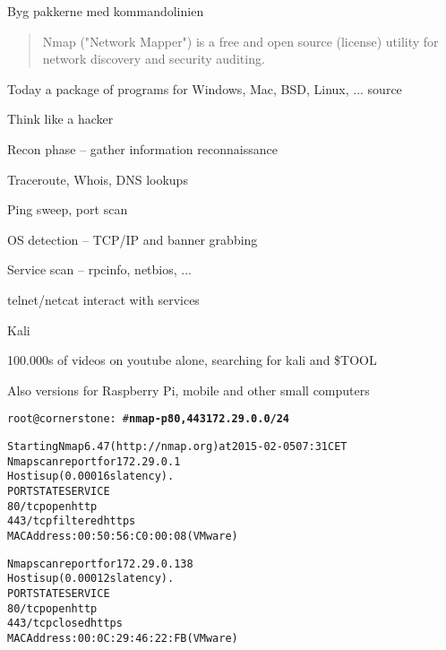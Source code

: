 \documentclass[20pt,landscape,a4paper,footrule]{foils}
\begin{document}
\vskip 1cm
\centerline{Byg pakkerne med kommandolinien}



\begin{quote}
Nmap ("Network Mapper") is a free and open source (license) utility for network discovery and security auditing.
\end{quote}

\centerline{Today a package of programs for Windows, Mac, BSD, Linux, ... source}







\begin{list1}
\item Think like a hacker
\item Recon phase -- gather information reconnaissance
\begin{list2}
\item Traceroute, Whois, DNS lookups
\item Ping sweep, port scan
\item OS detection -- TCP/IP and banner grabbing
\item Service scan -- rpcinfo, netbios, ...
\item telnet/netcat interact with services
\end{list2}
\end{list1}



\begin{list1}
\item  Kali 
\item 100.000s of videos on youtube alone, searching for kali and \$TOOL
\item Also versions for Raspberry Pi, mobile and other small computers
\end{list1}



\begin{alltt}\small
root@cornerstone:~#{\bfseries  nmap -p80,443 172.29.0.0/24}

Starting Nmap 6.47 ( http://nmap.org ) at 2015-02-05 07:31 CET
Nmap scan report for 172.29.0.1
Host is up (0.00016s latency).
PORT    STATE    SERVICE
{\color{darkgreen}80/tcp  open     http}
443/tcp filtered https
MAC Address: 00:50:56:C0:00:08 (VMware)

Nmap scan report for 172.29.0.138
Host is up (0.00012s latency).
PORT    STATE  SERVICE
{\color{darkgreen}80/tcp  open   http}
443/tcp closed https
MAC Address: 00:0C:29:46:22:FB (VMware)

\end{alltt}
\end{document}
